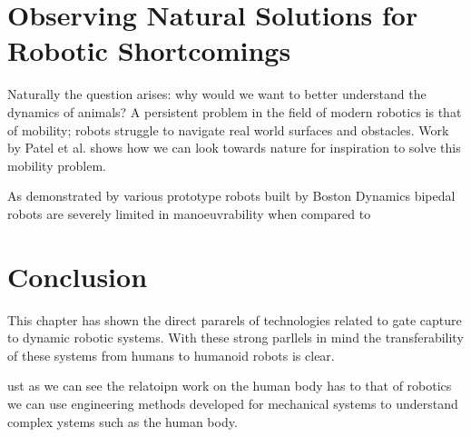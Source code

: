 \section{Observing Natural Solutions for Robotic Shortcomings}
Naturally the question arises:  why would we want to better understand the dynamics of animals? A persistent problem in the field of modern robotics is that of mobility; robots struggle to navigate real world surfaces and obstacles. Work by Patel et al. \cite{patel2013rapid} shows how we can look towards nature for inspiration to solve this mobility problem. 

As demonstrated by various prototype robots built by Boston Dynamics bipedal robots are severely limited in manoeuvrability when compared to   















\section{Conclusion}
This chapter has shown the direct pararels of technologies related to gate capture to dynamic robotic systems. With these strong parllels in mind the transferability of these systems from humans to humanoid robots is clear.

ust as we can see the relatoipn work on the human body has to that of robotics we can use engineering methods developed for mechanical systems to understand complex ystems such as the human body.





























